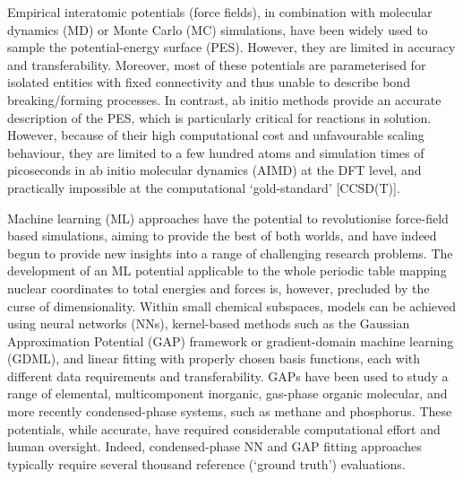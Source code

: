 \documentclass[../../main.tex]{subfiles}
\begin{document}
Empirical interatomic potentials (force fields), in combination with molecular dynamics (MD) or Monte Carlo (MC) simulations, have been widely used to sample the potential-energy surface (PES). However, they are limited in accuracy and transferability.\cite{Lindorff-Larsen2012} Moreover, most of these potentials are parameterised for isolated entities with fixed connectivity and thus unable to describe bond breaking/forming processes. In contrast, ab initio methods provide an accurate description of the PES, which is particularly critical for reactions in solution. However, because of their high computational cost and unfavourable scaling behaviour, they are limited to a few hundred atoms and simulation times of picoseconds in ab initio molecular dynamics (AIMD) at the DFT level, and practically impossible at the computational ‘gold-standard’ [CCSD(T)].\cite{Iftimie2005} 

Machine learning (ML) approaches have the potential to revolutionise force-field based simulations, aiming to provide the best of both worlds,\cite{Noe2020, Mueller2020, Unke2020} and have indeed begun to provide new insights into a range of challenging research problems.\cite{Khaliullin2011, Sosso2013, Niu2020, Cheng2020nature, Deringer2021, Ang2021, Cole2020, Rufa2020, Gastegger2017, Li2021} The development of an ML potential applicable to the whole periodic table mapping nuclear coordinates to total energies and forces is, however, precluded by the curse of dimensionality. Within small chemical subspaces, models can be achieved using neural networks (NNs),\cite{Unke2020, Behler2007, Behler2017, Smith2017, Schutt2017, Unke2019} kernel-based methods such as the Gaussian Approximation Potential (GAP) framework\cite{Bartok2010, Bartok2015} or gradient-domain machine learning (GDML),\cite{Chmiela2017} and linear fitting with properly chosen basis functions,\cite{Thompson2015, Shapeev2016} each with different data requirements and transferability.\cite{Zuo2020} GAPs have been used to study a range of elemental,\cite{Szlachta2014, Deringer2017, Bartok2018} multicomponent inorganic,\cite{Sivaraman2020, Mocanu2018} gas-phase organic molecular,\cite{Cole2020, Dral2020} and more recently condensed-phase systems, such as methane\cite{Veit2019} and phosphorus.\cite{Deringer2020} These potentials, while accurate, have required considerable computational effort and human oversight. Indeed, condensed-phase NN\cite{Cheng2019, Schran2020} and GAP fitting approaches typically require several thousand reference (`ground truth') evaluations.
\end{document}
